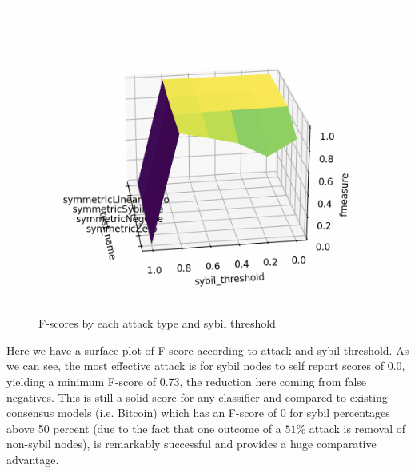 \documentclass{article}
\begin{document}
\begin{figure}
\centering
\includegraphics[width=\textwidth, height=\textwidth]{f-score-surface-plot}
\caption{F-scores by each attack type and sybil threshold}
\end{figure}

Here we have a surface plot of F-score according to attack and sybil threshold. As we can see, the most effective attack is for sybil nodes to self report scores of 0.0, yielding a minimum F-score of 0.73, the reduction here coming from false negatives. This is still a solid score for any classifier and compared to existing consensus models (i.e. Bitcoin) which has an F-score of 0 for sybil percentages above 50 percent (due to the fact that one outcome of a $51\%$ attack is removal of non-sybil nodes), is remarkably successful and provides a huge comparative advantage.
\end{document}
